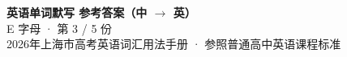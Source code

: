 \documentclass[10pt,a4paper]{article}
\begin{document}
\pagestyle{plain}

\begin{center}
{\LARGE\bfseries 英语单词默写 \quad 参考答案（中 $\to$ 英）}\\[0.22em]
{\large E 字母 · 第 3 / 5 份}\\[0.18em]
{\small 2026年上海市高考英语词汇用法手册 · 参照普通高中英语课程标准}
\end{center}

\vspace{0.2em}
\noindent{\color{rulegray}\rule{\textwidth}{0.8pt}}

\vspace{0.35em}

\vspace{0.25em}
\renewcommand{\arraystretch}{1.32}
\end{document}

